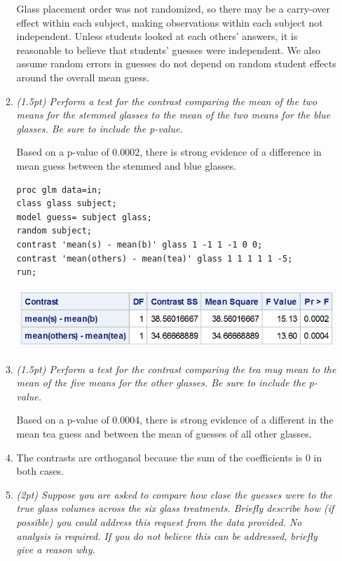 \documentclass{article}\usepackage[]{graphicx}\usepackage[]{color}
\begin{document}
\begin{enumerate}
\begin{enumerate}
Glass placement order was not randomized, so there may be a carry-over effect within each subject, making observations within each subject not independent. Unless students looked at each others' answers, it is reasonable to believe that students' guesses were independent. We also assume random errors in guesses do not depend on random student effects around the overall mean guess.


\item %
{\it  (1.5pt) Perform a test for the contrast comparing the mean of the two means for the stemmed
glasses to the mean of the two means for the blue glasses. Be sure to include the p-value.}

Based on a p-value of 0.0002, there is strong evidence of a difference in mean guess between the stemmed and blue glasses.

\begin{verbatim}proc glm data=in;
class glass subject;
model guess= subject glass;
random subject;
contrast 'mean(s) - mean(b)' glass 1 -1 1 -1 0 0;
contrast 'mean(others) - mean(tea)' glass 1 1 1 1 1 -5;
run;
\end{verbatim}

\includegraphics[scale=0.75]{contrastp2}

\item %
{\it  (1.5pt) Perform a test for the contrast comparing the tea mug mean to the mean of the five means for the other glasses. Be sure to include the p-value.}

Based on a p-value of 0.0004, there is strong evidence of a different in the mean tea guess and between the mean of guesses of all other glasses.

\item 

The contrasts are orthoganol because the sum of the coefficients is 0 in both cases.

\item 
{\it  (2pt) Suppose you are asked to compare how close the guesses were to the true glass volumes
across the six glass treatments. Briefly describe how (if possible) you could address this request
from the data provided. No analysis is required. If you do not believe this can be addressed,
briefly give a reason why.}


\end{enumerate}
\end{enumerate}
\end{document}
